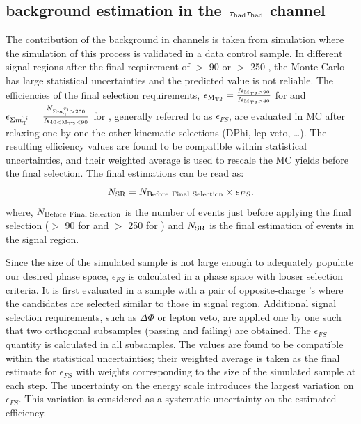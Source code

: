 \subsection{\texorpdfstring{\wjets background estimation in the $\,\tau_{\rm had}\tau_{\rm had}$ channel}{W+jets background estimation in the tau-tau channel}}
\label{sect:bkgW}
The contribution of the \wjets background in \tauTau channels is taken from simulation where the simulation of this process is validated in a data control sample. 
In different signal regions after the final requirement of \mttwo $>$ 90 \GeV or \SumMT $>$ 250 \GeV, 
the \wjets Monte Carlo has large statistical uncertainties and the predicted value is not reliable. 
The efficiencies of the final selection requirements, $\epsilon_{\rm M_{T2}}=\frac{N_{\rm M_{T2}>90}}{N_{\rm M_{T2}>40}}$ for  \binone and $\epsilon_{\Sigma m_{\rm T}^{\tau_i}}=\frac{N_{\Sigma m_{\rm T}^{\tau_i}>250}}{N_{40<\rm M_{T2}<90}}$ for \bintwo, generally referred to as $\epsilon_{FS}$, are evaluated in MC after relaxing one by one the other kinematic selections (DPhi, lep veto, …). The resulting efficiency values are found to be compatible within statistical uncertainties, and their weighted average is used to rescale the MC yields before the final selection.
The final estimations can be read as:
\begin{equation}
N_{\rm SR} = N_{\rm Before~Final~Selection} \times \epsilon_{FS}.
\end{equation}
where, $N_{\rm Before~Final~Selection}$ is the number of \wjets events just before applying the final selection 
(\mttwo $>$ 90 \GeV for \binone and \SumMT $>$ 250 \GeV for \bintwo) and $N_{\rm SR}$ is the final estimation of \wjets events in the signal region.

Since the size of the simulated \wjets sample is not large enough to adequately populate our desired phase space, %
$\epsilon_{FS}$ is calculated in a phase space with looser selection criteria. It is first evaluated in a \wjets sample with a pair of opposite-charge \Tau's where the \Tau candidates are selected similar to those in signal region. 
Additional signal selection requirements, such as $\Delta \Phi$ or lepton veto, are applied one by one such that two orthogonal subsamples (passing and failing) are obtained. The $\epsilon_{FS}$ quantity is calculated in all subsamples. The values are found to be compatible within the statistical uncertainties; their weighted average is taken as the final estimate for $\epsilon_{FS}$ with weights corresponding to the size of the simulated sample at each step. The uncertainty on the \Tau energy scale introduces the largest variation on $\epsilon_{FS}$. This variation is considered as a systematic uncertainty on the estimated efficiency.

